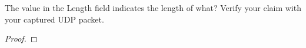 \documentclass[../../main.tex]{subfiles}
\begin{document}
\begin{wts}
The value in the Length field indicates the length of what? Verify your claim with your captured UDP packet. 
\end{wts}
\begin{proof}

\end{proof}
\end{document}
